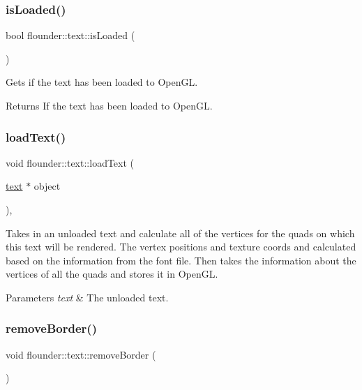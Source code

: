\subsubsection{\texorpdfstring{is\+Loaded()}{isLoaded()}}
{\footnotesize\ttfamily bool flounder\+::text\+::is\+Loaded (\begin{DoxyParamCaption}{ }\end{DoxyParamCaption})}



Gets if the text has been loaded to Open\+GL. 

\begin{DoxyReturn}{Returns}
If the text has been loaded to Open\+GL. 
\end{DoxyReturn}
\mbox{\label{classflounder_1_1text_aa5fea613182b186ca1c7b52900378e03}} 
\subsubsection{\texorpdfstring{load\+Text()}{loadText()}}
{\footnotesize\ttfamily void flounder\+::text\+::load\+Text (\begin{DoxyParamCaption}\item[{\hyperlink{classflounder_1_1text}{text} $\ast$}]{object }\end{DoxyParamCaption})\hspace{0.3cm}{\ttfamily [static]}, {\ttfamily [private]}}



Takes in an unloaded text and calculate all of the vertices for the quads on which this text will be rendered. The vertex positions and texture coords and calculated based on the information from the font file. Then takes the information about the vertices of all the quads and stores it in Open\+GL. 


\begin{DoxyParams}{Parameters}
{\em text} & The unloaded text. \\
\hline
\end{DoxyParams}
\mbox{\label{classflounder_1_1text_a55496b7300a9fd68d56f9ecf7f9351d8}} 
\subsubsection{\texorpdfstring{remove\+Border()}{removeBorder()}}
{\footnotesize\ttfamily void flounder\+::text\+::remove\+Border (\begin{DoxyParamCaption}{ }\end{DoxyParamCaption})}



